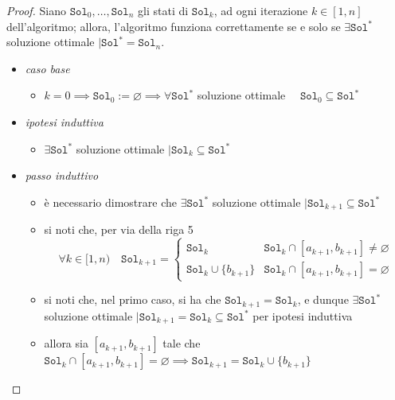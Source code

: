\documentclass[14pt]{extreport}
\theoremstyle{definition}
\theoremstyle{definition}
\begin{document}
\begin{proof}
    Siano $\texttt{Sol}_0, \ldots, \texttt{Sol}_n$ gli stati di $\texttt{Sol}_k$, ad ogni iterazione $k \in [1, n]$ dell'algoritmo; allora, l'algoritmo funziona correttamente se e solo se $\exists \texttt{Sol}^*$ soluzione ottimale $\mid \texttt{Sol}^* = \texttt{Sol}_n$.
    \begin{itemize}
        \textit{Prima implicazione.} $\exists \texttt{Sol}^*$ soluzione ottimale $\mid \texttt{Sol}_n \subseteq \texttt{Sol}^*$
        \item \textit{caso base}
            \begin{itemize}
                \item $k = 0 \implies \texttt{Sol}_0 := \varnothing \implies \forall \texttt{Sol}^*$ soluzione ottimale $\quad \texttt{Sol}_0 \subseteq \texttt{Sol}^*$
            \end{itemize}
        \item \textit{ipotesi induttiva}
            \begin{itemize}
                \item $\exists \texttt{Sol}^*$ soluzione ottimale $\mid \texttt{Sol}_k \subseteq \texttt{Sol}^*$
            \end{itemize}
        \item \textit{passo induttivo}
            \begin{itemize}
                \item è necessario dimostrare che $\exists \texttt{Sol}^*$ soluzione ottimale $\mid \texttt{Sol}_{k + 1} \subseteq \texttt{Sol}^*$
                \item si noti che, per via della riga 5 $$\forall k \in [1, n) \quad \texttt{Sol}_{k +1} = \left \{ \begin{array}{ll} \texttt{Sol}_k & \texttt{Sol}_k \cap [a_{k +1}, b_{k+1}] \neq \varnothing \\ \texttt{Sol}_k \cup \{b_{k +1}\} & \texttt{Sol}_k \cap [a_{k +1}, b_{k +1}] = \varnothing \end{array} \right.$$
                \item si noti che, nel primo caso, si ha che $\texttt{Sol}_{k +1} = \texttt{Sol}_k$, e dunque $\exists \texttt{Sol}^*$ soluzione ottimale $\mid \texttt{Sol}_{k +1} = \texttt{Sol}_k \subseteq \texttt{Sol}^*$ per ipotesi induttiva
                \item allora sia $[a_{k+1}, b_{k+1}]$ tale che $\texttt{Sol}_k \cap [a_{k+1}, b_{k +1}] = \varnothing \implies \texttt{Sol}_{k +1} = \texttt{Sol}_k \cup \{b_{k +1}\}$

\end{itemize}
\end{itemize}
\end{proof}
\end{document}
